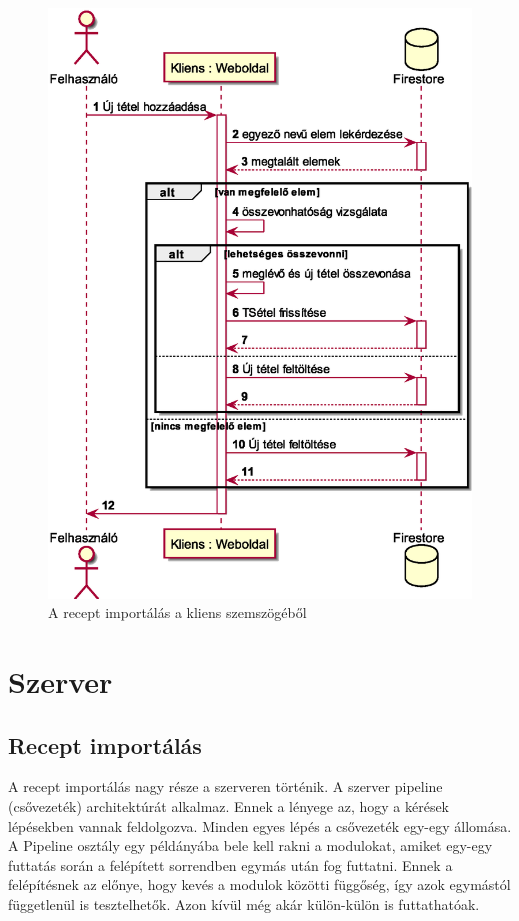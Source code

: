 \documentclass[12pt]{report}
\theoremstyle{definition}
\begin{document}
\noindent
\begin{figure}[H]
	\centering
	\includegraphics[width=.8\textwidth]{out/diagrams/clientShoppingListAdd/clientShoppingListAdd.eps}
	\caption{A recept importálás a kliens szemszögéből}
    \label{fig:clientShoppingListAdd}
\end{figure}

\section{Szerver}

\subsection{Recept importálás}
\label{serverImportsRecipe}
A recept importálás nagy része a szerveren történik. A szerver pipeline (csővezeték) architektúrát alkalmaz.
Ennek a lényege az, hogy a kérések lépésekben vannak feldolgozva. Minden egyes lépés a csővezeték egy-egy állomása.
A Pipeline osztály egy példányába bele kell rakni a modulokat, amiket egy-egy futtatás során a felépített sorrendben egymás után fog futtatni.
Ennek a felépítésnek az előnye, hogy kevés a modulok közötti függőség, így azok egymástól függetlenül is tesztelhetők.
Azon kívül még akár külön-külön is futtathatóak. 
\end{document}
